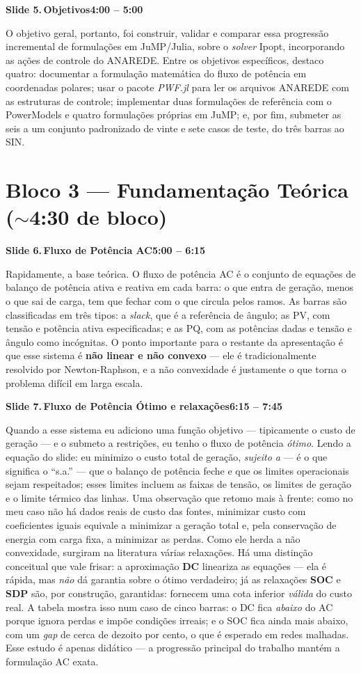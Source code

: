 \documentclass[11pt,a4paper]{article}
\newcommand{\slide}[3]{%
  \bigskip
  \noindent\colorbox{chipbg}{\parbox{\dimexpr\linewidth-2\fboxsep\relax}{%
    \textbf{\textcolor{ufcblue}{#1}}\,\textbf{#2}\hfill\textbf{\textcolor{ufcblue}{#3}}}}\par
  \nopagebreak\medskip
}
\begin{document}
\slide{Slide 5.}{Objetivos}{4:00 -- 5:00}
O objetivo geral, portanto, foi construir, validar e comparar essa progressão incremental de formulações em JuMP/Julia, sobre o \textit{solver} Ipopt, incorporando as ações de controle do ANAREDE. Entre os objetivos específicos, destaco quatro: documentar a formulação matemática do fluxo de potência em coordenadas polares; usar o pacote \textit{PWF.jl} para ler os arquivos ANAREDE com as estruturas de controle; implementar duas formulações de referência com o PowerModels e quatro formulações próprias em JuMP; e, por fim, submeter as seis a um conjunto padronizado de vinte e sete casos de teste, do três barras ao SIN.

\section*{\textcolor{ufcblue}{Bloco 3 --- Fundamentação Teórica ($\sim$4:30 de bloco)}}

\slide{Slide 6.}{Fluxo de Potência AC}{5:00 -- 6:15}
Rapidamente, a base teórica. O fluxo de potência AC é o conjunto de equações de balanço de potência ativa e reativa em cada barra: o que entra de geração, menos o que sai de carga, tem que fechar com o que circula pelos ramos. As barras são classificadas em três tipos: a \textit{slack}, que é a referência de ângulo; as PV, com tensão e potência ativa especificadas; e as PQ, com as potências dadas e tensão e ângulo como incógnitas. O ponto importante para o restante da apresentação é que esse sistema é \textbf{não linear e não convexo} --- ele é tradicionalmente resolvido por Newton-Raphson, e a não convexidade é justamente o que torna o problema difícil em larga escala.

\slide{Slide 7.}{Fluxo de Potência Ótimo e relaxações}{6:15 -- 7:45}
Quando a esse sistema eu adiciono uma função objetivo --- tipicamente o custo de geração --- e o submeto a restrições, eu tenho o fluxo de potência \emph{ótimo}. Lendo a equação do slide: eu minimizo o custo total de geração, \emph{sujeito a} --- é o que significa o ``s.a.'' --- que o balanço de potência feche e que os limites operacionais sejam respeitados; esses limites incluem as faixas de tensão, os limites de geração e o limite térmico das linhas. Uma observação que retomo mais à frente: como no meu caso não há dados reais de custo das fontes, minimizar custo com coeficientes iguais equivale a minimizar a geração total e, pela conservação de energia com carga fixa, a minimizar as perdas. Como ele herda a não convexidade, surgiram na literatura várias relaxações. Há uma distinção conceitual que vale frisar: a aproximação \textbf{DC} lineariza as equações --- ela é rápida, mas \emph{não} dá garantia sobre o ótimo verdadeiro; já as relaxações \textbf{SOC} e \textbf{SDP} são, por construção, garantidas: fornecem uma cota inferior \emph{válida} do custo real. A tabela mostra isso num caso de cinco barras: o DC fica \emph{abaixo} do AC porque ignora perdas e impõe condições irreais; e o SOC fica ainda mais abaixo, com um \textit{gap} de cerca de dezoito por cento, o que é esperado em redes malhadas. Esse estudo é apenas didático --- a progressão principal do trabalho mantém a formulação AC exata.
\end{document}
